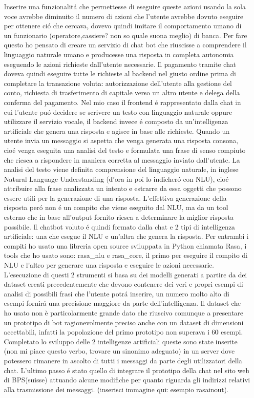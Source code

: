 Inserire una funzionalit\'a che permettesse di eseguire queste azioni usando la sola voce avrebbe diminuito il numero di azioni che l'utente avrebbe dovuto eseguire per ottenere ci\'o che cercava, dovevo quindi imitare il comportamento umano di un funzionario (operatore,cassiere? non so quale suona meglio) di banca. Per fare questo ho pensato di creare un servizio di chat bot che riuscisse a comprendere il linguaggio naturale umano e producesse una risposta in completa autonomia eseguendo le azioni richieste dall'utente necessarie.
Il pagamento tramite chat doveva quindi eseguire tutte le richieste al backend nel giusto ordine prima di completare la transazione voluta: autorizzazione dell'utente alla gestione del conto, richiesta di trasferimento di capitale verso un altro utente e delega della conferma del pagamento.
Nel mio caso il frontend \'e rappresentato dalla chat in cui l'utente pu\'o decidere se scrivere un testo con linguaggio naturale oppure utilizzare il servizio vocale, il backend invece \'e composto da un'intelligenza artificiale che genera una risposta e agisce in base alle richieste.
Quando un utente invia un messaggio si aspetta che venga generata una risposta consona, cio\'e venga eseguita una analisi del testo e formulata una frase di senso compiuto che riesca a rispondere in maniera corretta al messaggio inviato dall'utente. La analisi del testo viene definita comprensione del linguaggio naturale, in inglese Natural Language Understanding (d'ora in poi lo indicher\'o con NLU), cio\'e attribuire alla frase analizzata un intento e estrarre da essa oggetti che possono essere utili per la generazione di una risposta. L'effettiva generazione della risposta per\'o non \'e un compito che viene eseguito dal NLU, ma da un tool esterno che in base all'output fornito riesca a determinare la miglior risposta possibile.
Il chatbot voluto \'e quindi formato dalla chat e 2 tipi di intelligenza artificiale: una che esegue il NLU e un'altra che genera la risposta.
Per entrambi i compiti ho usato una libreria open source sviluppata in Python chiamata Rasa, i tools che ho usato sono: rasa\_nlu e rasa\_core, il primo per eseguire il compito di NLU e l'altro per generare una risposta e eseguire le azioni necessarie.
L'esecuzione di questi 2 strumenti si basa su dei modelli generati a partire da dei dataset creati precedentemente che devono contenere dei veri e propri esempi di analisi di possibili frasi che l'utente potr\'a inserire, un numero molto alto di esempi fornir\'a una precisione maggiore da parte dell'intelligenza.
Il dataset che ho usato non è particolarmente grande dato che riuscivo comunque a presentare un prototipo di bot ragionevolmente preciso anche con un dataset di dimensioni accettabili, infatti la popolazione del primo prototipo non superava i 60 esempi.
Completato lo sviluppo delle 2 intelligenze artificiali queste sono state inserite (non mi piace questo verbo, trovare un sinonimo adeguato) in un server dove potessero rimanere in ascolto di tutti i messaggi da parte degli utilizzatori della chat.
L'ultimo passo \'e stato quello di integrare il prototipo della chat nel sito web di BPS(suisse) attuando alcune modifiche per quanto riguarda gli indirizzi relativi alla trasmissione dei messaggi. 
(inserisci immagine qui: esempio rasainout).


